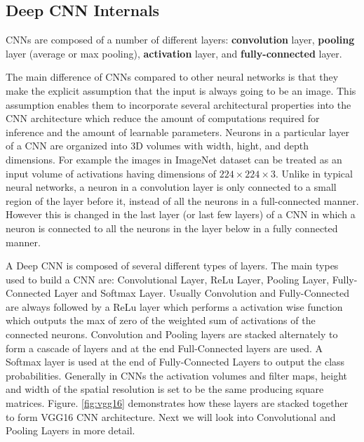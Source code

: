 \documentclass[10, sigconf]{acmart}
\begin{document}
\subsection{Deep CNN Internals}
CNNs are composed of a number of different layers: \textbf{convolution} layer, \textbf{pooling} layer (average or max pooling), \textbf{activation} layer, and \textbf{fully-connected} layer.

The main difference of CNNs compared to other neural networks is that they make the explicit assumption that the input is always going to be an image.
This assumption enables them to incorporate several architectural properties into the CNN architecture which reduce the amount of computations required for inference and the amount of learnable parameters.
Neurons in a particular layer of a CNN are organized into 3D volumes with width, hight, and depth dimensions.
For example the images in ImageNet dataset can be treated as an input volume of activations having dimensions of $224\times224\times3$.
Unlike in typical neural networks, a neuron in a convolution layer is only connected to a small region of the layer before it, instead of all the neurons in a full-connected manner.
However this is changed in the last layer (or last few layers) of a CNN in which a neuron is connected to all the neurons in the layer below in a fully connected manner. 

A Deep CNN is composed of several different types of layers. The main types used to build a CNN are: Convolutional Layer, ReLu Layer, Pooling Layer, Fully-Connected Layer and Softmax Layer. Usually Convolution and Fully-Connected are always followed by a ReLu layer which performs a activation wise function which outputs the max of zero of the weighted sum of activations of the connected neurons. Convolution and Pooling layers are stacked alternately to form a cascade of layers and at the end Full-Connected layers are used. A Softmax layer is used at the end of Fully-Connected Layers to output the class probabilities.
Generally in CNNs the activation volumes and filter maps, height and width of the spatial resolution is set to be the same producing square matrices.
Figure. \ref{fig:vgg16} demonstrates how these layers are stacked together to form VGG16 CNN architecture.
Next we will look into Convolutional and Pooling Layers in more detail.
\end{document}
